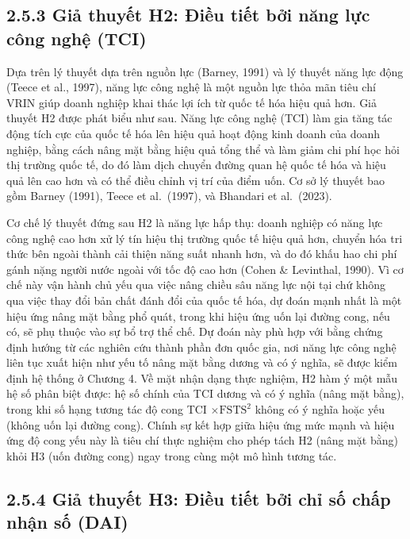 \documentclass[
  a4paper,
  13pt]{extreport}
\begin{document}
\hypertarget{giux1ea3-thuyux1ebft-h2-ux111iux1ec1u-tiux1ebft-bux1edfi-nux103ng-lux1ef1c-cuxf4ng-nghux1ec7-tci}{%
\subsection{2.5.3 Giả thuyết H2: Điều tiết bởi năng lực công nghệ
(TCI)}\label{giux1ea3-thuyux1ebft-h2-ux111iux1ec1u-tiux1ebft-bux1edfi-nux103ng-lux1ef1c-cuxf4ng-nghux1ec7-tci}}

Dựa trên lý thuyết dựa trên nguồn lực (Barney, 1991) và lý thuyết năng
lực động (Teece et al., 1997), năng lực công nghệ là một nguồn lực thỏa
mãn tiêu chí VRIN giúp doanh nghiệp khai thác lợi ích từ quốc tế hóa
hiệu quả hơn. Giả thuyết H2 được phát biểu như sau. Năng lực công nghệ
(TCI) làm gia tăng tác động tích cực của quốc tế hóa lên hiệu quả hoạt
động kinh doanh của doanh nghiệp, bằng cách nâng mặt bằng hiệu quả tổng
thể và làm giảm chi phí học hỏi thị trường quốc tế, do đó làm dịch
chuyển đường quan hệ quốc tế hóa và hiệu quả lên cao hơn và có thể điều
chỉnh vị trí của điểm uốn. Cơ sở lý thuyết bao gồm Barney (1991), Teece
et al.~(1997), và Bhandari et al.~(2023).

Cơ chế lý thuyết đứng sau H2 là năng lực hấp thụ: doanh nghiệp có năng
lực công nghệ cao hơn xử lý tín hiệu thị trường quốc tế hiệu quả hơn,
chuyển hóa tri thức bên ngoài thành cải thiện năng suất nhanh hơn, và do
đó khấu hao chi phí gánh nặng người nước ngoài với tốc độ cao hơn (Cohen
\& Levinthal, 1990). Vì cơ chế này vận hành chủ yếu qua việc nâng chiều
sâu năng lực nội tại chứ không qua việc thay đổi bản chất đánh đổi của
quốc tế hóa, dự đoán mạnh nhất là một hiệu ứng nâng mặt bằng phổ quát,
trong khi hiệu ứng uốn lại đường cong, nếu có, sẽ phụ thuộc vào sự bổ
trợ thể chế. Dự đoán này phù hợp với bằng chứng định hướng từ các nghiên
cứu thành phần đơn quốc gia, nơi năng lực công nghệ liên tục xuất hiện
như yếu tố nâng mặt bằng dương và có ý nghĩa, sẽ được kiểm định hệ thống
ở Chương 4. Về mặt nhận dạng thực nghiệm, H2 hàm ý một mẫu hệ số phân
biệt được: hệ số chính của TCI dương và có ý nghĩa (nâng mặt bằng),
trong khi số hạng tương tác độ cong TCI \(\times \text{FSTS}^2\) không
có ý nghĩa hoặc yếu (không uốn lại đường cong). Chính sự kết hợp giữa
hiệu ứng mức mạnh và hiệu ứng độ cong yếu này là tiêu chí thực nghiệm
cho phép tách H2 (nâng mặt bằng) khỏi H3 (uốn đường cong) ngay trong
cùng một mô hình tương tác.

\hypertarget{giux1ea3-thuyux1ebft-h3-ux111iux1ec1u-tiux1ebft-bux1edfi-chux1ec9-sux1ed1-chux1ea5p-nhux1eadn-sux1ed1-dai}{%
\subsection{2.5.4 Giả thuyết H3: Điều tiết bởi chỉ số chấp nhận số
(DAI)}\label{giux1ea3-thuyux1ebft-h3-ux111iux1ec1u-tiux1ebft-bux1edfi-chux1ec9-sux1ed1-chux1ea5p-nhux1eadn-sux1ed1-dai}}
\end{document}
